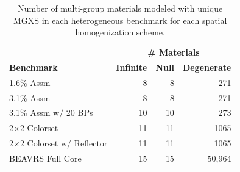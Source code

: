 \begin{table}[h!]
  \centering
  \caption[Number of multi-group material for each spatial homogenization scheme]{Number of multi-group materials modeled with unique \ac{MGXS} in each heterogeneous benchmark for each spatial homogenization scheme.}
  \small
  \label{table:chap8-num-materials}
  \vspace{6pt}
  \begin{tabular}{l r r r}
  \toprule
  \rowcolor{lightgray}
  & \multicolumn{3}{c}{\cellcolor{lightgray} \bf \# Materials} \\
  \multirow{-2}{*}{\cellcolor{lightgray} \bf Benchmark} &
  {\cellcolor{lightgray} \bf Infinite} &
  {\cellcolor{lightgray} \bf Null} &
  {\cellcolor{lightgray} \bf Degenerate} \\
  \midrule
1.6\% Assm & 8 & 8 & 271 \\
  \midrule
3.1\% Assm & 8 & 8 & 271 \\
  \midrule
3.1\% Assm w/ 20 BPs & 10 & 10 & 273  \\
  \midrule
2$\times$2 Colorset & 11 & 11 & 1065 \\
  \midrule
2$\times$2 Colorset w/ Reflector & 11 & 11 & 1065 \\
  \midrule
\ac{BEAVRS} Full Core & 15 & 15 & 50,964 \\
  \bottomrule
\end{tabular}
\end{table}



